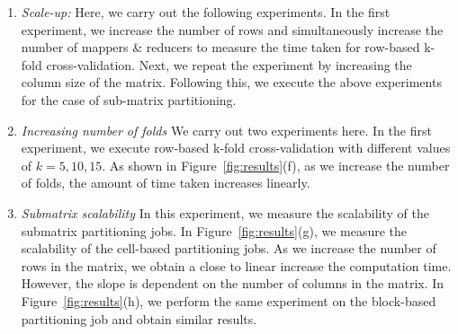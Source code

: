 \documentclass{vldb}
\begin{document}
{\begin{enumerate}
\item {\em Scale-up:} Here, we carry out the following experiments. In the first
experiment, we increase the number of rows and simultaneously increase the
number of mappers \& reducers to measure the time taken for row-based k-fold
cross-validation. Next, we repeat the experiment by increasing the column size
of the matrix. Following this, we execute the above experiments for the case of
sub-matrix partitioning.

\item {\em Increasing number of folds} We carry out two experiments here. In the
first experiment, we execute row-based k-fold cross-validation with different values of
$k = 5, 10, 15$. As shown in Figure~\ref{fig:results}(f), as we increase the
number of folds, the amount of time taken increases linearly.

\item {\em Submatrix scalability} In this experiment, we measure the scalability
of the submatrix partitioning jobs. In Figure~\ref{fig:results}(g), we measure
the scalability of the cell-based partitioning jobs. As we increase the number
of rows in the matrix, we obtain a close to linear increase the computation
time. However, the slope is dependent on the number of columns in the matrix. In
Figure~\ref{fig:results}(h), we perform the same experiment on the block-based
partitioning job and obtain similar results.
\end{enumerate}


\begin{figure}
\begin{tabular}{ccc}


\end{tabular}
\end{figure}}
\end{document}
